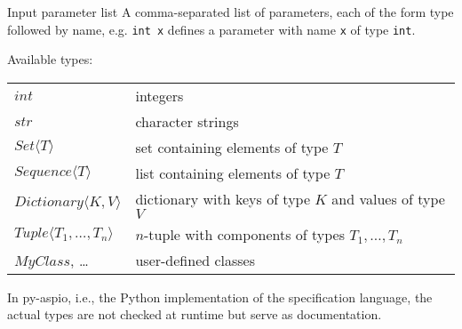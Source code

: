 \documentclass[%
beamer,%
english,%
10pt,%
]{beamer}
\newcommand{\blue}[1]{{\color{blue}#1}}
\begin{document}
\begin{frame}{Input parameter list}
    A comma-separated list of parameters, each of the form type followed by name, e.g. \blue{\lstinline{int x}} defines a parameter with name \blue{\lstinline{x}} of type \blue{\lstinline{int}}.

    \bigskip

    Available types: \\
    \begin{tabular}{ll}
        \blue{$\mathit{int}$}      & integers \\
        \blue{$\mathit{str}$}      & character strings \\
        \blue{$\mathit{Set} \langle T \rangle$}   & set containing elements of type $T$ \\
        \blue{$\mathit{Sequence} \langle T \rangle$}   & list containing elements of type $T$ \\
        \blue{$\mathit{Dictionary} \langle K, V \rangle$}   & dictionary with keys of type $K$ and values of type $V$ \\
        \blue{$\mathit{Tuple} \langle T_1,\dots,T_n \rangle$}   & $n$-tuple with components of types $T_1,\dots,T_n$ \\
        \blue{$\mathit{MyClass}$}, \dots   & user-defined classes \\
    \end{tabular}

    \bigskip

    In py-aspio, i.e., the Python implementation of the specification language,
    the actual types are not checked at runtime but serve as documentation.
\end{frame}
\end{document}
